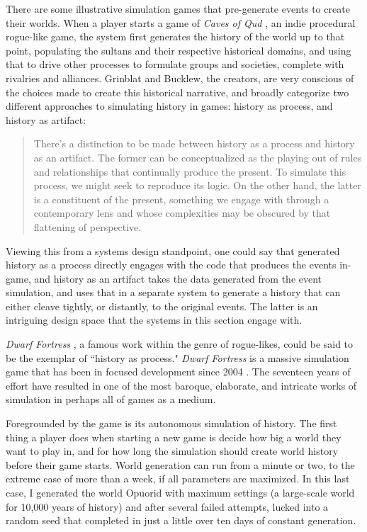 There are some illustrative simulation games that pre-generate events to create their worlds. When a player starts a game of \textit{Caves of Qud} \cite{qud}, an indie procedural rogue-like game, the system first generates the history of the world up to that point, populating the sultans and their respective historical domains, and using that to drive other processes to formulate groups and societies, complete with rivalries and alliances. Grinblat and Bucklew, the creators, are very conscious of the choices made to create this historical narrative, and broadly categorize two different approaches to simulating history in games: history as process, and history as artifact:

\begin{quote}
    There’s a distinction to be made between history as a process and history as an artifact. The former can be conceptualized as the playing out of rules and relationships that continually produce the present. To simulate this process, we might seek to reproduce its logic. On the other hand, the latter is a constituent of the present, something we engage with through a contemporary lens and whose complexities may be obscured by that flattening of perspective. \cite{grinblat2017subverting}
\end{quote}

Viewing this from a systems design standpoint, one could say that generated history as a process directly engages with the code that produces the events in-game, and history as an artifact takes the data generated from the event simulation, and uses that in a separate system to generate a history that can either cleave tightly, or distantly, to the original events. The latter is an intriguing design space that the systems in this section engage with.

\textit{Dwarf Fortress} \cite{dwarfFortress}, a famous work within the genre of rogue-likes, could be said to be the exemplar of ``history as process." \textit{Dwarf Fortress} is a massive simulation game that has been in focused development since 2004 \cite{df_history}. The seventeen years of effort have resulted in one of the most baroque, elaborate, and intricate works of simulation in perhaps all of games as a medium.

Foregrounded by the game is its autonomous simulation of history. The first thing a player does when starting a new game is decide how big a world they want to play in, and for how long the simulation should create world history before their game starts. World generation can run from a minute or two, to the extreme case of more than a week, if all parameters are maximized. In this last case, I generated the world Opuorid with maximum settings (a large-scale world for 10,000 years of history) and after several failed attempts, lucked into a random seed that completed in just a little over ten days of constant generation.

